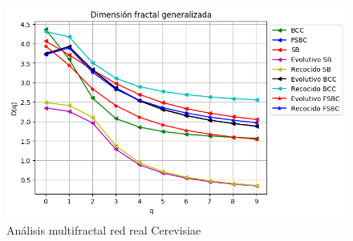 \begin{figure}[H]
        \centering
        \includegraphics[scale=0.5]{CapituloAAnexos/imagenesAnexoC/Fractalidad/grafica_Dq20180508_182332cerevisiae.png}
        \caption{Análisis multifractal red real Cerevisiae}
\end{figure}


